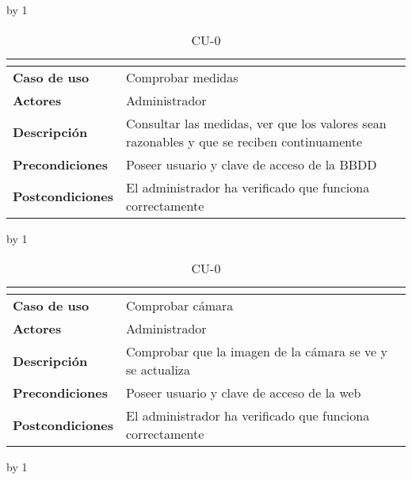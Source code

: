 \advance\cu by 1
\begin{table}[H]
	\centering
	\caption{CU-0\number\cu}
	\begin{tabular}{|l|p{}|}
		\hline
		\multicolumn{2}{|c|}{\cellcolor[HTML]{BFBFBF}{\color[HTML]{000000} \textbf{CU-0\number\cu}}} \\ \hline
		\textbf{Caso de uso}     & Comprobar medidas                                                                         \\ \hline
		\textbf{Actores}         & Administrador                                                                             \\ \hline
		\textbf{Descripción}     & Consultar las medidas, ver que los valores sean razonables y que se reciben continuamente \\ \hline
		\textbf{Precondiciones}  & Poseer usuario y clave de acceso de la BBDD                                               \\ \hline
		\textbf{Postcondiciones} & El administrador ha verificado que funciona correctamente                                 \\ \hline
	\end{tabular}
\end{table}
\advance\cu by 1
\begin{table}[H]
	\centering
	\caption{CU-0\number\cu}
	\begin{tabular}{|l|p{}|}
		\hline
		\multicolumn{2}{|c|}{\cellcolor[HTML]{BFBFBF}{\color[HTML]{000000} \textbf{CU-0\number\cu}}} \\ \hline
		\textbf{Caso de uso}     & Comprobar cámara                                          \\ \hline
		\textbf{Actores}         & Administrador                                             \\ \hline
		\textbf{Descripción}     & Comprobar que la imagen de la cámara se ve y se actualiza \\ \hline
		\textbf{Precondiciones}  & Poseer usuario y clave de acceso de la web                \\ \hline
		\textbf{Postcondiciones} & El administrador ha verificado que funciona correctamente \\ \hline
	\end{tabular}
\end{table}
\advance\cu by 1
